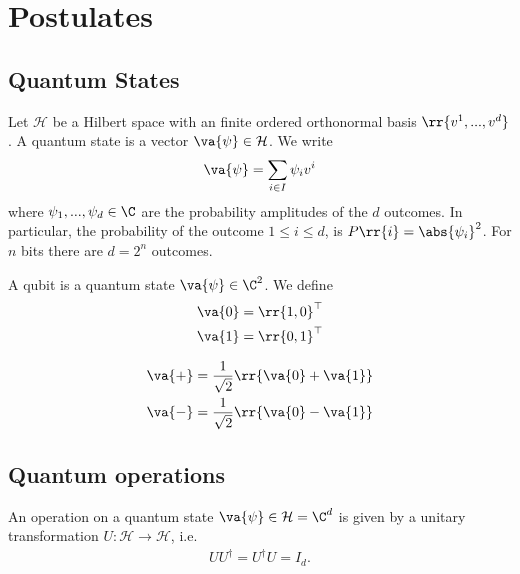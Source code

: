 \documentclass{article}
\begin{document}
\section{Postulates}
\label{sec:postulates}

\subsection{Quantum States}
\label{sec:quantum-states}

\begin{definition}
  \label{def:quantum-state}
  Let $\mathcal H$ be a Hilbert space with an finite ordered orthonormal basis
  $\rr{v^1, ..., v^d}$. A quantum state is a vector $\va{\psi}\in\mathcal H$.
  We write
  \begin{align*}
    \va{\psi} = \sum_{i\in I} \psi_i v^i
  \end{align*}
  where $\psi_1,...,\psi_d\in\C$ are the probability amplitudes of the $d$ outcomes.
  In particular, the probability of the outcome $1\leq i\leq d$, is $P \rr{ i } = \abs{ \psi_i }^2$.
  For $n$ bits there are $d=2^n$ outcomes.
\end{definition}

\begin{definition}
  \label{def:qubit}
  A qubit is a quantum state $ \va{\psi}\in\C^2$. We define
  \begin{align*}
    \va{ 0 } = \rr{ 1, 0 }^\top\\
    \va{ 1 } = \rr{ 0, 1 }^\top
  \end{align*}
\end{definition}

\begin{definition}
  \label{def:superposition}
  \begin{align*}
    \va{ + } = \frac{1}{\sqrt{2}} \rr{ \va{ 0 } + \va{ 1 } } \\
    \va{ - } = \frac{1}{\sqrt{2}} \rr{ \va{ 0 } - \va{ 1 } }
  \end{align*}
\end{definition}

\subsection{Quantum operations}
\label{sec:quantum-operations}

\begin{definition}
  \label{def:quantum-operation}
  An operation on a quantum state $ \va{ \psi } \in \mathcal H = \C^d$ is given by
  a unitary transformation $U:\mathcal H \to \mathcal H$, i.e.
  \begin{align*}
    UU^\dagger = U^\dagger U = I_d.
  \end{align*}
\end{definition}
\end{document}
